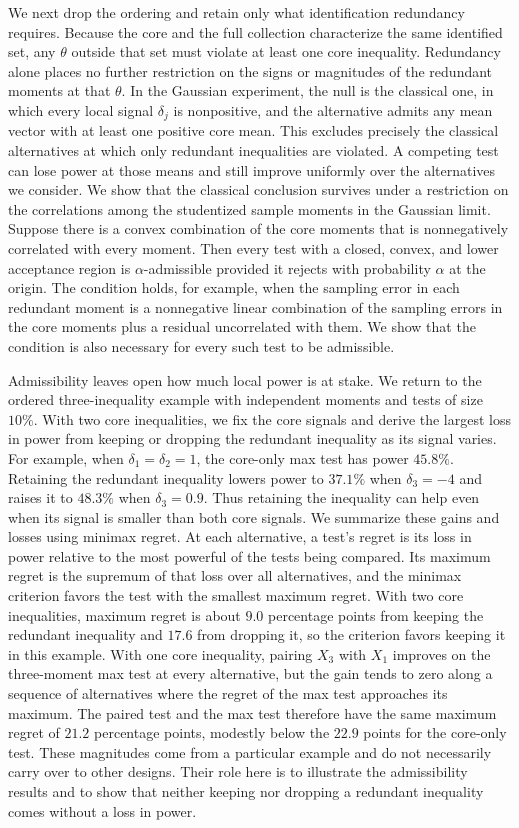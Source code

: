 \documentclass[11pt]{article}
\newcommand{\red}[1]{{\color{red}#1}} %
\numberwithin{equation}{section}
\theoremstyle{definition}
\begin{document}
We next drop the ordering and retain only what identification redundancy requires. Because the core and the full collection characterize the same identified set, any $\theta$ outside that set must violate at least one core inequality. Redundancy alone places no further restriction on the signs or magnitudes of the redundant moments at that $\theta$. In the Gaussian experiment, the null is the classical one, in which every local signal $\delta_j$ is nonpositive, and the alternative admits any mean vector with at least one positive core mean. This excludes precisely the classical alternatives at which only redundant inequalities are violated. A competing test can lose power at those means and still improve uniformly over the alternatives we consider. We show that the classical conclusion survives under a restriction on the correlations among the studentized sample moments in the Gaussian limit. Suppose there is a convex combination of the core moments that is nonnegatively correlated with every moment. Then every test with a closed, convex, and lower acceptance region is $\alpha$-admissible provided it rejects with probability $\alpha$ at the origin. The condition holds, for example, when the sampling error in each redundant moment is a nonnegative linear combination of the sampling errors in the core moments plus a residual uncorrelated with them. \red{We show that the condition is also necessary for every such test to be admissible. }

Admissibility leaves open how much local power is at stake. We return to the ordered three-inequality example with independent moments and tests of size $10\%$. With two core inequalities, we fix the core signals and derive the largest loss in power from keeping or dropping the redundant inequality as its signal varies. For example, when $\delta_1=\delta_2=1$, the core-only max test has power $45.8\%$. Retaining the redundant inequality lowers power to $37.1\%$ when $\delta_3=-4$ and raises it to $48.3\%$ when $\delta_3=0.9$. Thus retaining the inequality can help even when its signal is smaller than both core signals. We summarize these gains and losses using minimax regret. At each alternative, a test's regret is its loss in power relative to the most powerful of the tests being compared. Its maximum regret is the supremum of that loss over all alternatives, and the minimax criterion favors the test with the smallest maximum regret. With two core inequalities, maximum regret is about $9.0$ percentage points from keeping the redundant inequality and $17.6$ from dropping it, so the criterion favors keeping it in this example. With one core inequality, pairing $X_3$ with $X_1$ improves on the three-moment max test at every alternative, but the gain tends to zero along a sequence of alternatives where the regret of the max test approaches its maximum. The paired test and the max test therefore have the same maximum regret of $21.2$ percentage points, modestly below the $22.9$ points for the core-only test. These magnitudes come from a particular example and do not necessarily carry over to other designs. Their role here is to illustrate the admissibility results and to show that neither keeping nor dropping a redundant inequality comes without a loss in power.
\end{document}
